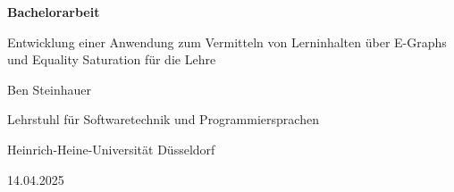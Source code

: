 \begin{frame}
    \thispagestyle{empty}
    \centering

    {\bf\color{black} Bachelorarbeit}\vspace{4mm}

    {\color{hhuUniBlau}\large Entwicklung einer Anwendung zum Vermitteln von Lerninhalten über E-Graphs und Equality Saturation für die Lehre}\vspace{4mm}

    {\color{hhuUniBlau} Ben Steinhauer}\vspace{3mm}

    {\footnotesize Lehrstuhl für Softwaretechnik und Programmiersprachen}\vspace{-1mm}

    {\footnotesize Heinrich-Heine-Universität Düsseldorf}\vspace{4mm}

    {\footnotesize 14.04.2025}

\end{frame}